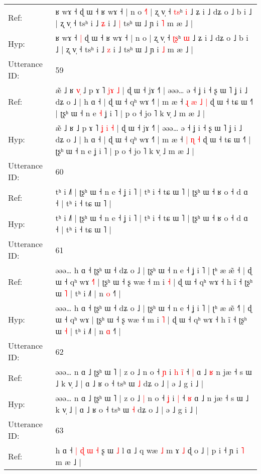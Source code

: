 \documentclass[10pt]{article}
\DeclareRobustCommand{\hl}[1]{{\textcolor{red}{#1}}}
\begin{document}
\begin{longtable}{ll}
Ref: & ʁ wɤ ˧\hl{}\hl{} ɖ ɯ ˧ ʁ wɤ ˧ | n o\hl{ }\hl{˧}\hl{˥} | ʐ v̩ ˧ \hl{t}\hl{s}ʰ \hl{i} ˩ ʑ i ˩ dʑ o ˩ b i ˩ | ʐ v̩ ˧ tsʰ i ˩ \hl{ʑ} i ˩\hl{ }\hl{|} tsʰ ɯ ˩ ɲ i \hl{˥} m æ ˩ |
 \\
Hyp: & ʁ wɤ ˧\hl{ }\hl{|} ɖ ɯ ˧ ʁ wɤ ˧ | n o\hl{}\hl{}\hl{} | ʐ v̩ ˧ \hl{ʈ}\hl{ʂ}ʰ \hl{ɯ} ˩ ʑ i ˩ dʑ o ˩ b i ˩ | ʐ v̩ ˧ tsʰ i ˩ \hl{z} i ˩\hl{}\hl{} tsʰ ɯ ˩ ɲ i \hl{˩} m æ ˩ |
 \\
\midrule
Utterance ID: & 59 \\
Ref: & æ̃ ˩ ʁ\hl{ }\hl{v}\hl{̩} ˩ p ɤ ˥ \hl{}\hl{j}\hl{ɤ} \hl{˩} | ɖ ɯ ˧ jɤ ˧˥ | əəə… ə ˧ ʝ i ˧ ʂ ɯ ˥ ʝ i ˩ dʑ o ˩ | h ɑ ˧ | ɖ ɯ ˧ qʰ wɤ ˧˥ | m æ ˧\hl{ }\hl{ɻ} \hl{æ} \hl{˩} \hl{|} ɖ ɯ ˧ tɕ ɯ ˧˥ | ʈʂʰ ɯ ˧ n e\hl{ }\hl{˧} ʝ i ˥ | p o ˧ jo ˥ k v̩ ˩ m æ ˩ |
 \\
Hyp: & æ̃ ˩ ʁ\hl{}\hl{}\hl{} ˩ p ɤ ˥ \hl{ʝ}\hl{ }\hl{i} \hl{˧} | ɖ ɯ ˧ jɤ ˧˥ | əəə… ə ˧ ʝ i ˧ ʂ ɯ ˥ ʝ i ˩ dʑ o ˩ | h ɑ ˧ | ɖ ɯ ˧ qʰ wɤ ˧˥ | m æ ˧\hl{}\hl{} \hl{|} \hl{ɳ} \hl{˧} ɖ ɯ ˧ tɕ ɯ ˧˥ | ʈʂʰ ɯ ˧ n e\hl{}\hl{} ʝ i ˥ | p o ˧ jo ˥ k v̩ ˩ m æ ˩ |
 \\
\midrule
Utterance ID: & 60 \\
Ref: & tʰ i ˩˥ | ʈʂʰ ɯ ˧ n e ˧ ʝ i ˥ | tʰ i ˧ tɕ ɯ ˥ | ʈʂʰ ɯ ˧ ʁ o ˧ d ɑ ˧ | tʰ i ˧ tɕ ɯ ˥ |
 \\
Hyp: & tʰ i ˩˥ | ʈʂʰ ɯ ˧ n e ˧ ʝ i ˥ | tʰ i ˧ tɕ ɯ ˥ | ʈʂʰ ɯ ˧ ʁ o ˧ d ɑ ˧ | tʰ i ˧ tɕ ɯ ˥ |
 \\
\midrule
Utterance ID: & 61 \\
Ref: & əəə… h ɑ ˧ ʈʂʰ ɯ ˧ dʑ o ˩ | ʈʂʰ ɯ ˧ n e ˧ ʝ i ˥ | ʈʰ æ æ̃ ˧\hl{} | ɖ ɯ ˧ qʰ wɤ\hl{ }\hl{˧}\hl{˥} | ʈʂʰ ɯ ˧ ʂ wæ ˧ m i \hl{˧} | ɖ ɯ ˧ qʰ wɤ ˧ h ĩ ˧ ʈʂʰ ɯ \hl{˥} | tʰ i ˩˥ | n \hl{o} ˧˥ |
 \\
Hyp: & əəə… h ɑ ˧ ʈʂʰ ɯ ˧ dʑ o ˩ | ʈʂʰ ɯ ˧ n e ˧ ʝ i ˥ | ʈʰ æ æ̃ ˧\hl{˥} | ɖ ɯ ˧ qʰ wɤ\hl{}\hl{}\hl{} | ʈʂʰ ɯ ˧ ʂ wæ ˧ m i \hl{˥} | ɖ ɯ ˧ qʰ wɤ ˧ h ĩ ˧ ʈʂʰ ɯ \hl{˧} | tʰ i ˩˥ | n \hl{ɑ} ˧˥ |
 \\
\midrule
Utterance ID: & 62 \\
Ref: & əəə… n ɑ ˩ ʈʂʰ ɯ ˥ | z o ˩\hl{}\hl{} n o ˧ \hl{ɲ} i\hl{ }\hl{h} \hl{i}\hl{̃} ˧ \hl{|} ɑ ˩\hl{ }\hl{ʁ} n jæ ˧ s ɯ ˩ k v̩ ˩ | ɑ ˩ ʁ o ˧ tsʰ ɯ \hl{˩} dʑ o ˩ | ə ˩ g i ˩ |
 \\
Hyp: & əəə… n ɑ ˩ ʈʂʰ ɯ ˥ | z o ˩\hl{ }\hl{|} n o ˧ \hl{ʝ} i\hl{}\hl{} \hl{}\hl{|} ˧ \hl{ʁ} ɑ ˩\hl{}\hl{} n jæ ˧ s ɯ ˩ k v̩ ˩ | ɑ ˩ ʁ o ˧ tsʰ ɯ \hl{˧} dʑ o ˩ | ə ˩ g i ˩ |
 \\
\midrule
Utterance ID: & 63 \\
Ref: & h ɑ ˧ \hl{|} \hl{ɖ} \hl{ɯ} \hl{˧} ʂ ɯ \hl{˩} l ɑ ˩\hl{}\hl{} q wæ \hl{˩} m ɤ \hl{˩} ɖ o ˩ | p i ˧ ɲ i \hl{˥} m æ ˩ |

\end{longtable}
\end{document}
